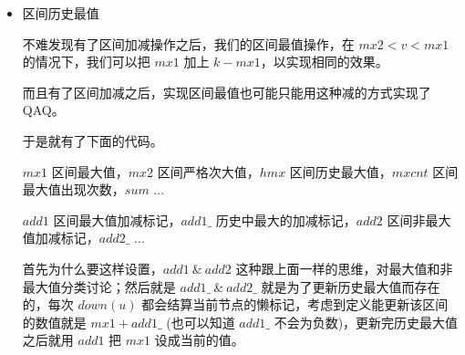 \documentclass[a4paper,12pt]{article}
\begin{document}
\begin{itemize}
\item 
    区间历史最值

    不难发现有了区间加减操作之后，我们的区间最值操作，在 \(mx2 < v < mx1\)
    的情况下，我们可以把 \(mx1\) 加上 \(k-mx1\)，以实现相同的效果。
    
    而且有了区间加减之后，实现区间最值也可能只能用这种减的方式实现了QAQ。
    
    于是就有了下面的代码。
    
    \(mx1\) 区间最大值，\(mx2\) 区间严格次大值，\(hmx\)
    区间历史最大值，\(mxcnt\) 区间最大值出现次数，\(sum\) ...
    
    \(add1\) 区间最大值加减标记，\(add1\_\) 历史中最大的加减标记，\(add2\)
    区间非最大值加减标记，\(add2\_\) ...
    
    首先为什么要这样设置，\(add1 \ \& \ add2\)
    这种跟上面一样的思维，对最大值和非最大值分类讨论；然后就是
    \(add1\_ \ \& \ add2\_\) 就是为了更新历史最大值而存在的，每次
    \(down(u)\) 都会结算当前节点的懒标记，考虑到定义能更新该区间的数值就是
    \(mx1 + add1\_\) (也可以知道 \(add1\_\)
    不会为负数)，更新完历史最大值之后就用 \(add1\) 把 \(mx1\) 设成当前的值。   
\end{itemize}
\end{document}
